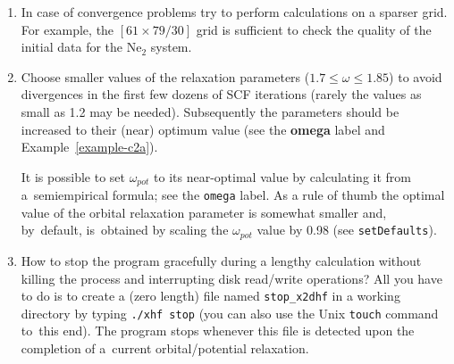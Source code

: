\documentclass[12pt,a4paper]{article}
\newcommand{\ft}[1]{\texttt{#1}}
\begin{document}
\begin{enumerate}
\item In case of convergence problems try to perform calculations on a sparser grid.
%  
%  
  For example, the $[61\times 79/30]$ grid is sufficient to check the quality of the
  initial data for the Ne$_2$ system.

\item Choose smaller values of the relaxation parameters ($1.7\leq \omega\leq 1.85$) to
  avoid divergences in the first few dozens of SCF iterations (rarely the values as small
  as 1.2 may be needed).  Subsequently the parameters should be increased to their (near)
  optimum value (see the \textbf{omega} label and Example~\ref{example-c2a}).

It is possible to set $\omega_{pot}$ to its near-optimal value by calculating it from
a~semiempirical formula; 
see the \ft{omega} label. As a rule of thumb the optimal value of the orbital
relaxation parameter is somewhat smaller and, by~default, is~obtained by scaling the
$\omega_{pot}$ value by 0.98 (see \ft{setDefaults}).

\item \label{section:hints} How to stop the program gracefully during a lengthy calculation
  without killing the process and interrupting disk read/write operations?
  All you have to do is to create a (zero length) file named \texttt{stop\_x2dhf} in a working
  directory by typing \texttt{./xhf stop} (you can also use the Unix \texttt{touch}
  command to~this end). The program stops whenever this file is detected upon the
  completion of a~current orbital/potential relaxation.



\end{enumerate} 
\end{document}
